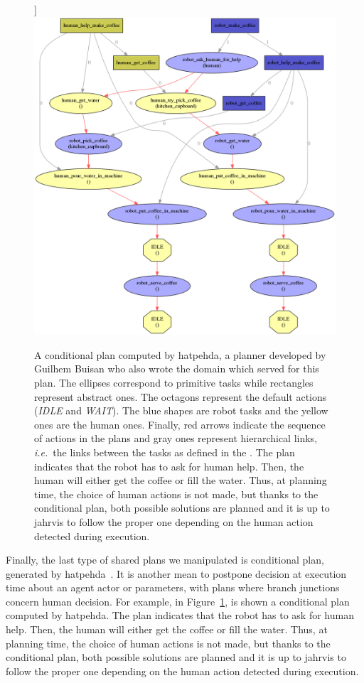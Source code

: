 \documentclass[a4paper,11pt,twoside]{StyleThese}
\begin{document}
\begin{figure}[!htb]]
	\centering
	\includegraphics[width=\linewidth]{figures/chapter2/cond_plan_coffee.png}
	\caption{A conditional plan computed by \acrshort{hatpehda}, a planner developed by Guilhem Buisan who also wrote the domain which served for this plan. The ellipses correspond to primitive tasks while rectangles represent abstract ones. The octagons represent the default actions (\textit{IDLE} and \textit{WAIT}). The blue shapes are robot tasks and the yellow ones are the human ones. Finally, red arrows indicate the sequence of actions in the plans and gray ones represent hierarchical links, \textit{i.e.}~the links between the tasks as defined in the . The plan indicates that the robot has to ask for human help. Then, the human will either get the coffee or fill the water. Thus, at planning time, the choice of human actions is not made, but thanks to the conditional plan, both possible solutions are planned and it is up to \acrshort{jahrvis} to follow the proper one depending on the human action detected during execution.}
	\label{chap2:fig:cond_plan_coffee}
\end{figure}

Finally, the last type of shared plans we manipulated is conditional plan, generated by \acrfull{hatpehda}~\cite{buisan_2021_human}. It is another mean to postpone decision at execution time about an agent actor or parameters, with plans where branch junctions concern human decision. For example, in Figure~\ref{chap2:fig:cond_plan_coffee}, is shown a conditional plan computed by \acrshort{hatpehda}. The plan indicates that the robot has to ask for human help. Then, the human will either get the coffee or fill the water. Thus, at planning time, the choice of human actions is not made, but thanks to the conditional plan, both possible solutions are planned and it is up to \acrshort{jahrvis} to follow the proper one depending on the human action detected during execution.
\end{document}
